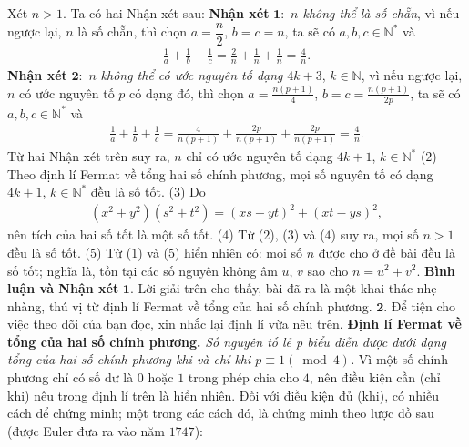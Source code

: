 \begin{multicols}{2}
	\vskip 0.05cm
	Xét $n > 1$.
	\vskip 0.05cm
	Ta có hai Nhận xét sau:
	\vskip 0.05cm
	\textbf{Nhận xét} $\pmb{1:}$ \textit{$n$ không thể là số chẵn}, vì nếu ngược lại, $n$ là số chẵn, thì chọn  $a= \dfrac{n}{2}$, $b = c = n$, ta sẽ có $a,b,c \in \mathbb{N^*}$  và
	\begin{align*}
		\frac{1}{a} + \frac{1}{b} + \frac{1}{c} = \frac{2}{n} + \frac{1}{n} + \frac{1}{n} = \frac{4}{n}.
	\end{align*}
	\textbf{Nhận xét} $\pmb{2:}$ $n$ \textit{không thể có ước nguyên tố dạng} $4k + 3$, $k \in \mathbb{N}$, vì nếu ngược lại, $n$ có ước nguyên tố $p$ có dạng đó, thì chọn  $a = \frac{{n\left( {p + 1} \right)}}{4}$,  $b = c = \frac{{n\left( {p + 1} \right)}}{{2p}}$, ta sẽ có $a,b,c \in \mathbb{N^*}$  và
	\begin{align*}
		\frac{1}{a} + \frac{1}{b} + \frac{1}{c} = \frac{4}{{n\left( {p + 1} \right)}} + \frac{{2p}}{{n\left( {p + 1} \right)}} + \frac{{2p}}{{n\left( {p + 1} \right)}} = \frac{4}{n}.
	\end{align*}
	Từ hai Nhận xét trên suy ra, $n$ chỉ có ước nguyên tố dạng $4k + 1$, $k \in \mathbb{N^*}$  \hfill        ($2$)
	\vskip 0.05cm
	Theo định lí Fermat về tổng hai số chính phương, mọi số nguyên tố có dạng $4k + 1$, $k \in \mathbb{N^*}$  đều là số tốt. \hfill ($3$)
	\vskip 0.05cm
	Do
	\begin{align*}
		\left( {{x^2} + {y^2}} \right)\left( {{s^2} + {t^2}} \right) = {\left( {xs + yt} \right)^2} + {\left( {xt - ys} \right)^2},
	\end{align*}
	nên tích của hai số tốt là một số tốt. \hfill ($4$)
	\vskip 0.05cm
	Từ ($2$), ($3$) và ($4$) suy ra, mọi số $n > 1$ đều là số tốt. ($5$)
	\vskip 0.05cm
	Từ ($1$) và ($5$) hiển nhiên có: mọi số $n$ được cho ở đề bài đều là số tốt; nghĩa là, tồn tại các số nguyên không âm $u$, $v$ sao cho $n = u^2 + v^2$.
	\vskip 0.05cm 
	\textbf{Bình luận và Nhận xét}
	\vskip 0.05cm
	$\pmb{1.}$ Lời giải trên cho thấy, bài đã ra là một khai thác nhẹ nhàng, thú vị từ định lí Fermat về tổng của hai số chính phương.
	\vskip 0.05cm
	$\pmb{2.}$ Để tiện cho việc theo dõi của bạn đọc, xin nhắc lại định lí vừa nêu trên.
	\vskip 0.05cm
	\textbf{Định lí Fermat về tổng của hai số chính phương.} \textit{Số nguyên tố lẻ p biểu diễn được dưới dạng tổng của hai số chính phương khi và chỉ khi $p \equiv 1\left( {\bmod 4} \right)$.}
	\vskip 0.05cm 
	Vì một số chính phương chỉ có số dư là $0$ hoặc $1$ trong phép chia cho $4$, nên điều kiện cần (chỉ khi) nêu trong định lí trên là hiển nhiên.
	\vskip 0.05cm
	Đối với điều kiện đủ (khi), có nhiều cách để chứng minh; một trong các cách đó, là chứng minh theo lược đồ sau (được Euler đưa ra vào năm $1747$):

\end{multicols}
